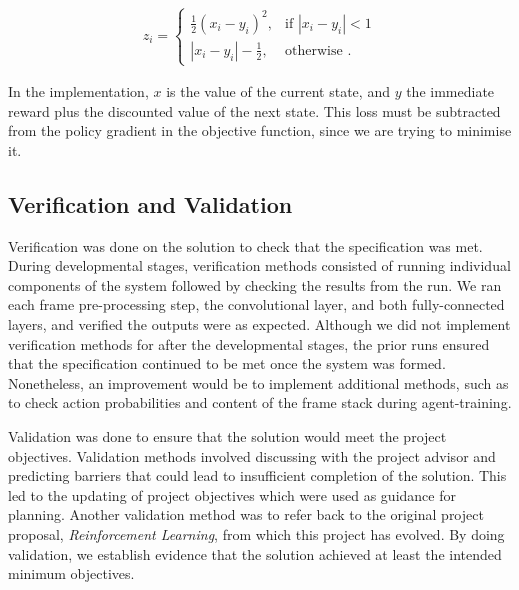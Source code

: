 \documentclass[12pt,a4paper]{article}
\begin{document}
\[\begin{aligned}
z_{i} =
\begin{cases}
\frac{1}{2} (x_i - y_i)^2, & \text{if } |x_i - y_i| < 1 \\
|x_i - y_i| - \frac{1}{2}, & \text{otherwise }.
\end{cases}
\end{aligned}\]

In the implementation, $x$ is the value of the current state, and $y$ the immediate reward plus the discounted value of the next state. This loss must be subtracted from the policy gradient in the objective function, since we are trying to minimise it.

\subsection{Verification and Validation}
Verification was done on the solution to check that the specification was met. During developmental stages, verification methods consisted of running individual components of the system followed by checking the results from the run. We ran each frame pre-processing step, the convolutional layer, and both fully-connected layers, and verified the outputs were as expected. Although we did not implement verification methods for after the developmental stages, the prior runs ensured that the specification continued to be met once the system was formed. Nonetheless, an improvement would be to implement additional methods, such as to check action probabilities and content of the frame stack during agent-training.


Validation was done to ensure that the solution would meet the project objectives. Validation methods involved discussing with the project advisor and predicting barriers that could lead to insufficient completion of the solution. This led to the updating of project objectives which were used as guidance for planning. Another validation method was to refer back to the original project proposal, \textit{Reinforcement Learning}, from which this project has evolved. By doing validation, we establish evidence that the solution achieved at least the intended minimum objectives.  
\end{document}
